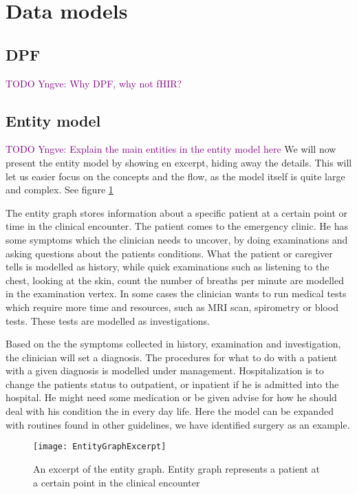 \section{Data models}

\subsection{DPF}
\textcolor{purple}{TODO Yngve: Why DPF, why not fHIR?}
\subsection{Entity model}
\textcolor{purple}{TODO Yngve: Explain the main entities in the entity model here}
We will now present the entity model by showing en excerpt, hiding away the details. This will let us easier focus on the concepts and the flow, as the model itself is quite large and complex. See figure \ref{fig:EntityGraphExcerpt}

The entity graph stores information about a specific patient at a certain point or time in the clinical encounter. The patient comes to the emergency clinic. He has some symptoms which the clinician needs to uncover, by doing examinations and asking questions about the patients conditions. What the patient or caregiver tells is modelled as history, while quick examinations such as listening to the chest, looking at the skin, count the number of breaths per minute are modelled in the examination vertex. In some cases the clinician wants to run medical tests which require more time and resources, such as MRI scan, spirometry or blood tests. These tests are modelled as investigations.

Based on the the symptoms collected in history, examination and investigation, the clinician will set a diagnosis. The procedures for what to do with a patient with a given diagnosis is modelled under management. Hospitalization is to change the patients status to outpatient, or inpatient if he is admitted into the hospital. He might need some medication or be given advise for how he should deal with his condition the in every day life. Here the model can be expanded with routines found in other guidelines, we have identified surgery as an example. 
\begin{figure}[h!]
	\caption {An excerpt of the entity graph. Entity graph represents a patient at a certain point in the clinical encounter}
	\label{fig:EntityGraphExcerpt}
	\texttt{[image: EntityGraphExcerpt]}
\end{figure}

